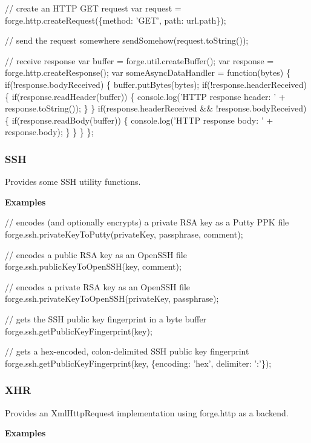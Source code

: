 \begin{DoxyCode}
// create an HTTP GET request
var request = forge.http.createRequest(\{method: 'GET', path: url.path\});

// send the request somewhere
sendSomehow(request.toString());

// receive response
var buffer = forge.util.createBuffer();
var response = forge.http.createResponse();
var someAsyncDataHandler = function(bytes) \{
  if(!response.bodyReceived) \{
    buffer.putBytes(bytes);
    if(!response.headerReceived) \{
      if(response.readHeader(buffer)) \{
        console.log('HTTP response header: ' + response.toString());
      \}
    \}
    if(response.headerReceived && !response.bodyReceived) \{
      if(response.readBody(buffer)) \{
        console.log('HTTP response body: ' + response.body);
      \}
    \}
  \}
\};
\end{DoxyCode}


\label{_ssh}%
 \subsubsection*{S\+SH}

Provides some S\+SH utility functions.

{\bfseries Examples}


\begin{DoxyCode}
// encodes (and optionally encrypts) a private RSA key as a Putty PPK file
forge.ssh.privateKeyToPutty(privateKey, passphrase, comment);

// encodes a public RSA key as an OpenSSH file
forge.ssh.publicKeyToOpenSSH(key, comment);

// encodes a private RSA key as an OpenSSH file
forge.ssh.privateKeyToOpenSSH(privateKey, passphrase);

// gets the SSH public key fingerprint in a byte buffer
forge.ssh.getPublicKeyFingerprint(key);

// gets a hex-encoded, colon-delimited SSH public key fingerprint
forge.ssh.getPublicKeyFingerprint(key, \{encoding: 'hex', delimiter: ':'\});
\end{DoxyCode}


\label{_xhr}%
 \subsubsection*{X\+HR}

Provides an Xml\+Http\+Request implementation using forge.\+http as a backend.

{\bfseries Examples}



